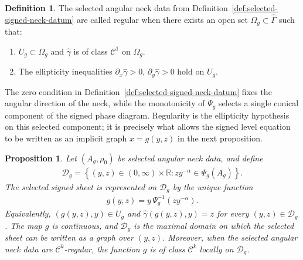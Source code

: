 \documentclass{amsart}
\theoremstyle{plain}
\newtheorem{proposition}[theorem]{Proposition}
\theoremstyle{mainintrothm}
\theoremstyle{definition}
\newtheorem{definition}[theorem]{Definition}
\begin{document}
	\begin{definition}
		\label{def:regular-signed-neck-datum}
		The selected angular neck data from
		Definition~\ref{def:selected-signed-neck-datum} are called regular when there
		exists an open set $\Omega_g\subset\widehat\Gamma$ such that:
		\begin{enumerate}[label=\textup{(R\arabic*)}, ref=R\arabic*]
			\item \label{hyp:regular-neighborhood}
			$U_g\subset\Omega_g$ and $\widehat\gamma$ is of class
			$\mathcal C^1$ on $\Omega_g$.


			\item \label{hyp:regular-ellipticity}
			The ellipticity inequalities $\partial_x\widehat\gamma>0$, $\partial_y\widehat\gamma>0$ hold on $U_g$.
		\end{enumerate}


	\end{definition}

	The zero condition in Definition~\ref{def:selected-signed-neck-datum} fixes the
	angular direction of the neck, while the monotonicity of $\Psi_g$ selects a
	single conical component of the signed phase diagram.  Regularity is the
	ellipticity hypothesis on this selected component; it is precisely what allows
	the signed level equation to be written as an implicit graph $x=g(y,z)$ in the
	next proposition.


	\begin{proposition}
		\label{prop:conical-sheet-maximal-chart}
		Let $(A_g,\rho_0)$ be selected angular neck data, and define
		\begin{align*}
			\mathcal D_g
			=
			\left\{
			(y,z)\in(0,\infty)\times\mathbb R:
			zy^{-\alpha}\in\Psi_g(A_g)
			\right\}.
		\end{align*}
		The selected signed sheet is represented on $\mathcal D_g$ by the
		unique function
		\begin{align*}
			g(y,z)
			=
			y\,\Psi_g^{-1}\!\left(zy^{-\alpha}\right).
		\end{align*}
		Equivalently, $(g(y,z),y)\in U_g$ and
		$\widehat\gamma(g(y,z),y)=z$ for every $(y,z)\in\mathcal D_g$.  The map $g$
		is continuous, and $\mathcal D_g$ is the maximal domain on which the
		selected sheet can be written as a graph over $(y,z)$.  Moreover, when the
		selected angular neck data are $\mathcal C^k$-regular, the function $g$ is
		of class $\mathcal C^k$ locally on $\mathcal D_g$.
	\end{proposition}
\end{document}
